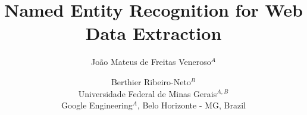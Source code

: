 \documentclass{nle}
\begin{document}
\title{Named Entity Recognition for Web Data Extraction}

\author[João Mateus de Freitas Veneroso and Berthier Ribeiro-Neto]
       {João Mateus de Freitas Veneroso$^A$ \and
        Berthier Ribeiro-Neto$^B$\\
	Universidade Federal de Minas Gerais$^{A,B}$ \\
	Google Engineering$^A$, Belo Horizonte - MG, Brazil}

% 

\maketitle
\end{document}
